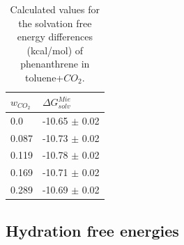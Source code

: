 \documentclass[final,12p,times,twocolumn]{elsarticle}
\begin{document}
	\begin{table}
		\centering
		\caption{Calculated values for the solvation free energy differences (kcal/mol) of phenanthrene in toluene+$CO_{2}$.}
		\label{tbl:solvco2}
		\begin{tabular}{ll}
			\hline\hline
			$w_{CO_{2}}$ & $\Delta G_{solv}^{Mie}$ \\ \hline
			0.0          & -10.65 $\pm$ 0.02       \\
			0.087        & -10.73 $\pm$ 0.02       \\
			0.119        & -10.78 $\pm$ 0.02       \\
			0.169        & -10.71 $\pm$ 0.02       \\
			0.289        & -10.69 $\pm$ 0.02       \\ \hline\hline
		\end{tabular}
	\end{table}
	
	\subsection{Hydration free energies}
	
\end{document}
